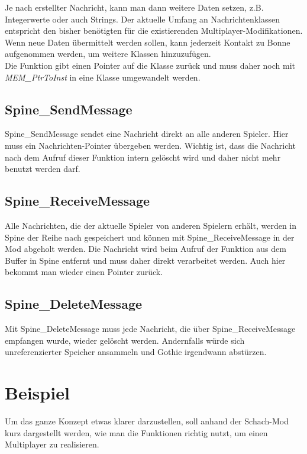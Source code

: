 \documentclass{article}
\begin{document}
Je nach erstellter Nachricht, kann man dann weitere Daten setzen, z.B. Integerwerte oder auch Strings. Der aktuelle Umfang an Nachrichtenklassen entspricht den bisher benötigten für die existierenden Multiplayer-Modifikationen. Wenn neue Daten übermittelt werden sollen, kann jederzeit Kontakt zu Bonne aufgenommen werden, um weitere Klassen hinzuzufügen.\\

Die Funktion gibt einen Pointer auf die Klasse zurück und muss daher noch mit \textit{MEM\_PtrToInst} in eine Klasse umgewandelt werden.

\subsection{Spine\_SendMessage}

Spine\_SendMessage sendet eine Nachricht direkt an alle anderen Spieler. Hier muss ein Nachrichten-Pointer übergeben werden. Wichtig ist, dass die Nachricht nach dem Aufruf dieser Funktion intern gelöscht wird und daher nicht mehr benutzt werden darf.

\subsection{Spine\_ReceiveMessage}

Alle Nachrichten, die der aktuelle Spieler von anderen Spielern erhält, werden in Spine der Reihe nach gespeichert und können mit Spine\_ReceiveMessage in der Mod abgeholt werden. Die Nachricht wird beim Aufruf der Funktion aus dem Buffer in Spine entfernt und muss daher direkt verarbeitet werden. Auch hier bekommt man wieder einen Pointer zurück.

\subsection{Spine\_DeleteMessage}

Mit Spine\_DeleteMessage muss jede Nachricht, die über Spine\_ReceiveMessage empfangen wurde, wieder gelöscht werden. Andernfalls würde sich unreferenzierter Speicher ansammeln und Gothic irgendwann abstürzen.

\section{Beispiel}

Um das ganze Konzept etwas klarer darzustellen, soll anhand der Schach-Mod kurz dargestellt werden, wie man die Funktionen richtig nutzt, um einen Multiplayer zu realisieren.\\
\end{document}
